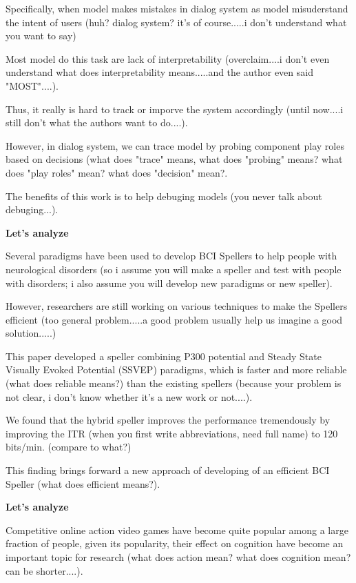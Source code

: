 Specifically, when model makes mistakes in dialog system as model misuderstand the intent of users (huh? dialog system? it's of course.....i don't understand what you want to say) 

Most model do this task are lack of interpretability (overclaim....i don't even understand what does interpretability means.....and the author even said "MOST"....). 

Thus, it really is  hard to track or imporve the system accordingly (until now....i still don't what the authors want to do....). 

However, in dialog system,  we can trace model by probing component play roles based on decisions (what does "trace" means, what does "probing" means? what does "play roles" mean?  what does "decision" mean?.

The benefits of this work is to help debuging models (you never talk about debuging...).

\textbf{Let's analyze}

Several paradigms have been used to develop BCI Spellers to help people with neurological disorders (so i assume you will make a speller and test with people with disorders; i also assume you will develop new paradigms or new speller). 

However, researchers are still working on various techniques to make the Spellers efficient (too general problem.....a good problem usually help us imagine a good solution.....)

This paper developed a speller combining P300 potential and Steady State Visually Evoked Potential (SSVEP) paradigms, which is faster and more reliable (what does reliable means?) than the existing spellers (because your problem is not clear, i don't know whether it's a new work or not....). 

We found that the hybrid speller improves the performance tremendously by improving the ITR (when you first write abbreviations, need full name) to 120 bits/min.  (compare to what?)

This finding brings forward a new approach of developing of an efficient BCI Speller (what does efficient means?).

\textbf{Let's analyze}

Competitive online action video games have become quite popular among a large fraction of people, given its popularity, their effect on cognition have become an important topic for research (what does action mean?  what does cognition mean? can be shorter....). 

